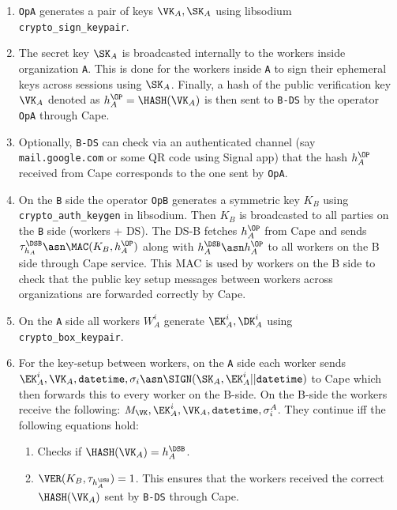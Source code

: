 \begin{enumerate}
  \item \verb|OpA| generates a pair of keys $\VK_A, \SK_A$
  using libsodium \verb|crypto_sign_keypair|.
  \item The secret key $\SK_A$ is broadcasted internally to the workers
  inside organization \verb|A|.  This is done for the workers inside \verb|A|
  to sign their ephemeral keys across sessions using $\SK_A$.  Finally, a
  hash of the public verification key $\VK_A$ denoted as $h_A^\OP =
  \HASH(\VK_A)$ is then sent to \verb|B-DS| by the operator \verb|OpA|
  through Cape.
  
  \item Optionally, \verb|B-DS| can check via an authenticated channel (say
  \verb|mail.google.com| or some QR code using Signal app) that the hash $h_A^\OP$ received
  from Cape corresponds to the one sent by \verb|OpA|.

  \item On the \verb|B| side the operator \verb|OpB| generates a symmetric key $K_B$
  using \verb|crypto_auth_keygen| in libsodium.
  Then $K_B$ is broadcasted to all parties on the \verb|B| side (workers +
  DS). The DS-B fetches $h_A^\OP$ from Cape and sends $\tau_{h_A}^\DSB \asn
  \MAC(K_B, h_A^\OP)$ along with $h_A^\DSB \asn h_A^\OP$ to all workers on the B side
  through Cape service. This MAC is used by workers on the B side to check
  that the public key setup messages between workers across organizations are
  forwarded correctly by Cape.

  \item On the \verb|A| side all workers $W_A^i$ generate $\EK_A^i, \DK_A^i$
  using \verb|crypto_box_keypair|.

  \item For the key-setup between workers, on the \verb|A| side each worker
  sends $\EK_A^i, \VK_A, \verb|datetime|, \sigma_i \asn \SIGN(\SK_A, \EK_A^i
  || \verb|datetime|)$ to Cape which then forwards this to every worker on
  the B-side. On the B-side the workers receive the following: $M_\VK,
  \EK_A^i, \VK_A, \verb|datetime|, \sigma^A_i$.
  They continue iff the following equations hold:

  \begin{enumerate}
    \item Checks if $\HASH(\VK_A) = h_A^\DSB$.
    \item $\VER(K_B, \tau_{h_A^\DSB}) = 1$. This ensures that the workers
    received the correct $\HASH(\VK_A)$ sent by \verb|B-DS| through Cape.


\end{enumerate}
\end{enumerate}
